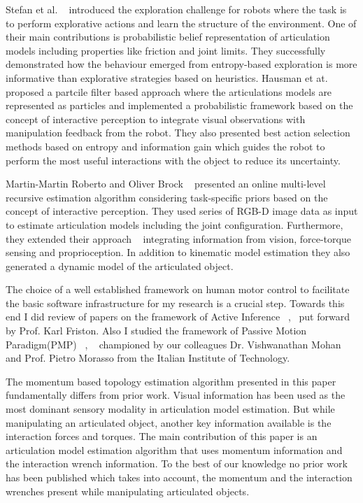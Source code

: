 \documentclass[12pt,a4paper]{report}
\begin{document}
Stefan et al. ~\cite{otte2014entropy} introduced the exploration challenge for robots where the task is to perform explorative actions and learn the structure of the environment. One of their main contributions is probabilistic belief representation of articulation models including properties like friction and joint limits. They successfully demonstrated how the behaviour emerged from entropy-based exploration is more informative than explorative strategies based on heuristics. Hausman et at. ~\cite{hausman2015active} proposed a partcile filter based approach where the articulations models are represented as particles and implemented a probabilistic framework based on the concept of interactive perception to integrate visual observations with manipulation feedback from the robot. They also presented best action selection methods based on entropy and information gain which guides the robot to perform the most useful interactions with the object to reduce its uncertainty.

Martin-Martin Roberto and Oliver Brock ~\cite{martin2014online} presented an online multi-level recursive estimation algorithm considering task-specific priors based on the concept of interactive perception. They used series of RGB-D image data as input to estimate articulation models including the joint configuration. Furthermore, they extended their approach ~\cite{martin2017building} integrating information from vision, force-torque sensing and proprioception. In addition to kinematic model estimation they also generated a dynamic model of the articulated object. 

The choice of a well established framework on human motor control to facilitate the basic software infrastructure for my research is a crucial step. Towards this end I did review of papers on the framework of Active Inference ~\cite{friston2015active},~\cite{friston2011action} put forward by Prof. Karl Friston. Also I studied the framework of Passive Motion Paradigm(PMP) ~\cite{mohan2011passive}, ~\cite{mohan2013inference} championed by our colleagues Dr. Vishwanathan Mohan and Prof. Pietro Morasso from the Italian Institute of Technology.

The momentum based topology estimation algorithm presented in this paper fundamentally differs from prior work. Visual information has been used as the most dominant sensory modality in articulation model estimation. But while manipulating an articulated object, another key information available is the interaction forces and torques. The main contribution of this paper is an articulation model estimation algorithm that uses momentum information and the interaction wrench information. To the best of our knowledge no prior work has been published which takes into account, the momentum and the interaction wrenches present while manipulating articulated objects. 
	
\end{document}
